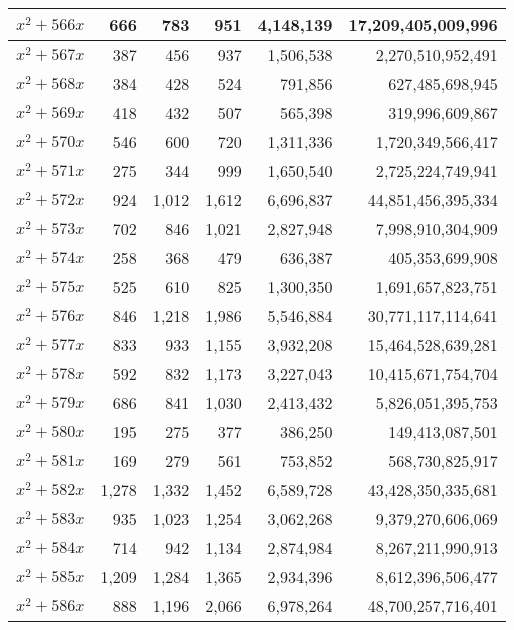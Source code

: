 \documentclass[a4paper]{amsproc}
\theoremstyle{plain}
\begin{document}
\begin{longtable}{ | l | r | r | r | r | r | }
$x^2 + 566x$ & 666 & 783 & 951 & 4{,}148{,}139 & 17{,}209{,}405{,}009{,}996 \\ \hline
$x^2 + 567x$ & 387 & 456 & 937 & 1{,}506{,}538 & 2{,}270{,}510{,}952{,}491 \\ \hline
$x^2 + 568x$ & 384 & 428 & 524 & 791{,}856 & 627{,}485{,}698{,}945 \\ \hline
$x^2 + 569x$ & 418 & 432 & 507 & 565{,}398 & 319{,}996{,}609{,}867 \\ \hline
$x^2 + 570x$ & 546 & 600 & 720 & 1{,}311{,}336 & 1{,}720{,}349{,}566{,}417 \\ \hline
$x^2 + 571x$ & 275 & 344 & 999 & 1{,}650{,}540 & 2{,}725{,}224{,}749{,}941 \\ \hline
$x^2 + 572x$ & 924 & 1{,}012 & 1{,}612 & 6{,}696{,}837 & 44{,}851{,}456{,}395{,}334 \\ \hline
$x^2 + 573x$ & 702 & 846 & 1{,}021 & 2{,}827{,}948 & 7{,}998{,}910{,}304{,}909 \\ \hline
$x^2 + 574x$ & 258 & 368 & 479 & 636{,}387 & 405{,}353{,}699{,}908 \\ \hline
$x^2 + 575x$ & 525 & 610 & 825 & 1{,}300{,}350 & 1{,}691{,}657{,}823{,}751 \\ \hline
$x^2 + 576x$ & 846 & 1{,}218 & 1{,}986 & 5{,}546{,}884 & 30{,}771{,}117{,}114{,}641 \\ \hline
$x^2 + 577x$ & 833 & 933 & 1{,}155 & 3{,}932{,}208 & 15{,}464{,}528{,}639{,}281 \\ \hline
$x^2 + 578x$ & 592 & 832 & 1{,}173 & 3{,}227{,}043 & 10{,}415{,}671{,}754{,}704 \\ \hline
$x^2 + 579x$ & 686 & 841 & 1{,}030 & 2{,}413{,}432 & 5{,}826{,}051{,}395{,}753 \\ \hline
$x^2 + 580x$ & 195 & 275 & 377 & 386{,}250 & 149{,}413{,}087{,}501 \\ \hline
$x^2 + 581x$ & 169 & 279 & 561 & 753{,}852 & 568{,}730{,}825{,}917 \\ \hline
$x^2 + 582x$ & 1{,}278 & 1{,}332 & 1{,}452 & 6{,}589{,}728 & 43{,}428{,}350{,}335{,}681 \\ \hline
$x^2 + 583x$ & 935 & 1{,}023 & 1{,}254 & 3{,}062{,}268 & 9{,}379{,}270{,}606{,}069 \\ \hline
$x^2 + 584x$ & 714 & 942 & 1{,}134 & 2{,}874{,}984 & 8{,}267{,}211{,}990{,}913 \\ \hline
$x^2 + 585x$ & 1{,}209 & 1{,}284 & 1{,}365 & 2{,}934{,}396 & 8{,}612{,}396{,}506{,}477 \\ \hline
$x^2 + 586x$ & 888 & 1{,}196 & 2{,}066 & 6{,}978{,}264 & 48{,}700{,}257{,}716{,}401 \\ \hline

\end{longtable}
\end{document}
